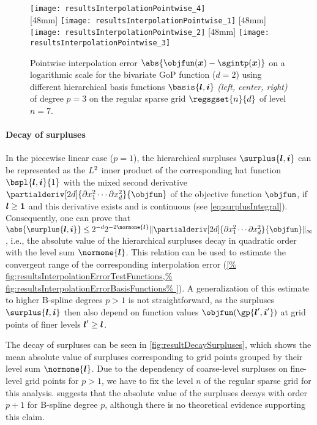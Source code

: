 \begin{figure}
  \texttt{[image: resultsInterpolationPointwise\_4]}\\[2mm]%
  [48mm]{%
    \texttt{[image: resultsInterpolationPointwise\_1]}%
  }%
  \hfill%
  [48mm]{%
    \texttt{[image: resultsInterpolationPointwise\_2]}%
  }%
  \hfill%
  [48mm]{%
    \texttt{[image: resultsInterpolationPointwise\_3]}%
  }%
  \caption[Pointwise interpolation error]{%
    Pointwise interpolation error
    $\abs{\objfun(\*x) - \sgintp(\*x)}$ on a logarithmic scale
    for the bivariate GoP function ($d = 2$)
    using different hierarchical basis functions
    $\basis{\*l,\*i}$ \emph{(left, center, right)} of degree $p = 3$ on
    the regular sparse grid $\regsgset{n}{d}$ of level $n = 7$.%
  }%
  \label{fig:resultsInterpolationErrorPointwise}%
\end{figure}

\paragraph{Decay of surpluses}

In the piecewise linear case ($p = 1$),
the hierarchical surpluses $\surplus{\*l,\*i}$
can be represented as the $L^2$ inner product of
the corresponding hat function $\bspl{\*l,\*i}{1}$ with the
mixed second derivative
$\partialderiv[2d]{\partialdiff x_1^2 \dotsm \partialdiff x_d^2}{\objfun}$
of the objective function $\objfun$,
if ${\boldsymbol{l}} \ge {\boldsymbol{1}}$ and this derivative exists and is continuous
(see \cref{eq:surplusIntegral}).
Consequently, one can prove that
$\abs{\surplus{\*l,\*i}} \le 2^{-d} 2^{-2\normone{\*l}}
\norm[\infty]{
  \partialderiv[2d]{\partialdiff x_1^2 \dotsm \partialdiff x_d^2}{\objfun}
}$ \cite{Bungartz04Sparse},
i.e., the absolute value of the hierarchical surpluses
decay in quadratic order with the level sum $\normone{\*l}$.
This relation can be used to estimate the convergent range
of the corresponding interpolation error (\cref{%
  fig:resultsInterpolationErrorTestFunctions,%
  fig:resultsInterpolationErrorBasisFunctions%
}).
A generalization of this estimate to higher B-spline degrees $p > 1$
is not straightforward, as the surpluses $\surplus{\*l,\*i}$
then also depend on function values $\objfun(\gp{\*l',\*i'})$ at
grid points of finer levels ${\boldsymbol{l}}' \ge {\boldsymbol{l}}$.

The decay of surpluses can be seen in \cref{fig:resultDecaySurpluses},
which shows the mean absolute value of surpluses corresponding to
grid points grouped by their level sum $\normone{\*l}$.
Due to the dependency of coarse-level surpluses on fine-level grid points
for $p > 1$,
we have to fix the level $n$ of the regular sparse grid for this analysis.
 suggests that the
absolute value of the surpluses decays with order $p + 1$ for
B-spline degree $p$, although there is no theoretical evidence supporting
this claim.

